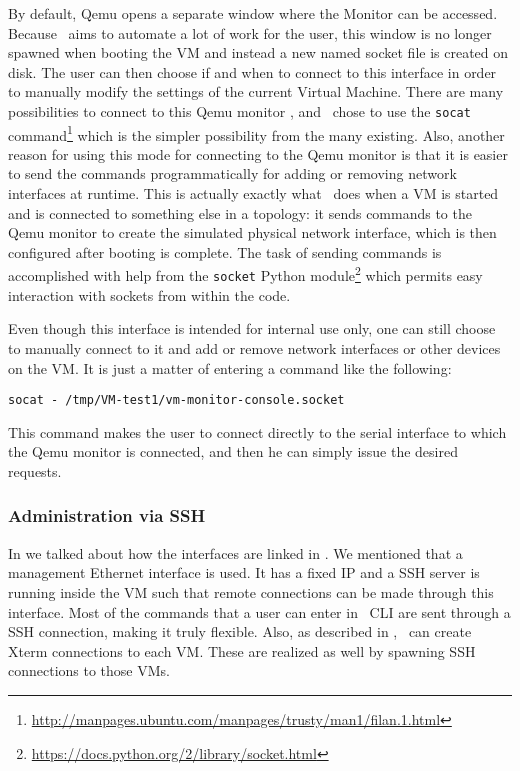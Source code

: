 By default, Qemu opens a separate window where the Monitor can be accessed.
Because \project\ aims to automate a lot of work for the user, this window is no longer spawned when booting the VM and instead a new named socket file is created on disk.
The user can then choose if and when to connect to this interface in order to manually modify the settings of the current Virtual Machine.
There are many possibilities to connect to this Qemu monitor \cite{qemu-monitor}, and \project\ chose to use the \texttt{socat} command\footnote{\url{http://manpages.ubuntu.com/manpages/trusty/man1/filan.1.html}} which is the simpler possibility from the many existing.
Also, another reason for using this mode for connecting to the Qemu monitor is that it is easier to send the commands programmatically for adding or removing network interfaces at runtime.
This is actually exactly what \project\ does when a VM is started and is connected to something else in a topology: it sends commands to the Qemu monitor to create the simulated physical network interface, which is then configured after booting is complete.
The task of sending commands is accomplished with help from the \texttt{socket} Python module\footnote{\url{https://docs.python.org/2/library/socket.html}} which permits easy interaction with sockets from within the code.

Even though this interface is intended for internal use only, one can still choose to manually connect to it and add or remove network interfaces or other devices on the VM.
It is just a matter of entering a command like the following:

\lstset{label=lst:socat-example}
\begin{lstlisting}
socat - /tmp/VM-test1/vm-monitor-console.socket
\end{lstlisting}

This command makes the user to connect directly to the serial interface to which the Qemu monitor is connected, and then he can simply issue the desired requests.

\subsubsection{Administration via SSH}
\label{sub-sub-sec:admin-SSH}

In  we talked about how the interfaces are linked in \project.
We mentioned that a management Ethernet interface is used.
It has a fixed IP and a SSH server is running inside the VM such that remote connections can be made through this interface.
Most of the commands that a user can enter in \project\ CLI are sent through a SSH connection, making it truly flexible.
Also, as described in , \project\ can create Xterm connections to each VM.
These are realized as well by spawning SSH connections to those VMs.

